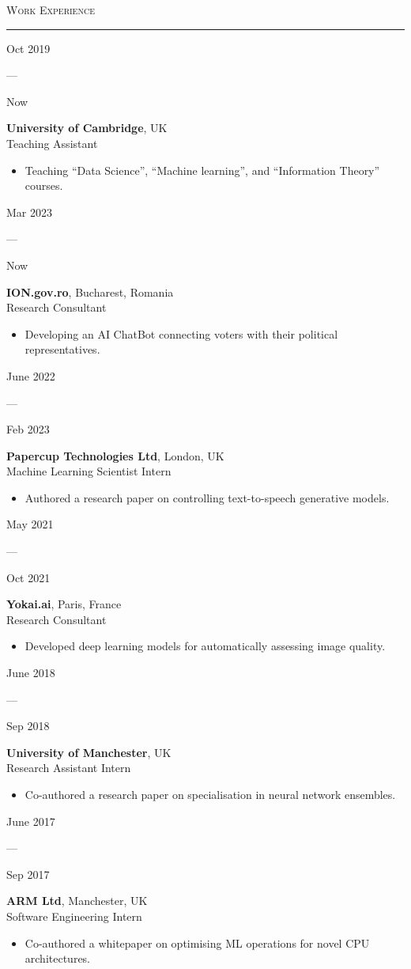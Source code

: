 \documentclass[a4paper]{article}
\newcommand{\entry}[6]{
    \begin{minipage}[t]{.05\textwidth}
        \centering #1
    \end{minipage}
    ---
    \begin{minipage}[t]{.05\textwidth}
        \centering #2
    \end{minipage}
    \hfill
    \begin{minipage}[t]{.85\textwidth}
        \textbf{#3}, #4\\
        #5\\
        \vspace{-1em}
        #6
    \end{minipage}
}
\begin{document}
\vspace{1em}

\textsc{\Large Work Experience}

\rule{\textwidth}{1pt}

\entry{Oct 2019}{Now}{University of Cambridge}{UK}{Teaching Assistant}{
    \begin{itemize}[leftmargin=*]
        \item Teaching ``Data Science'', ``Machine learning'', and ``Information Theory'' courses.
    \end{itemize}
}

\entry{Mar 2023}{Now}{ION.gov.ro}{Bucharest, Romania}{Research Consultant}{
    \begin{itemize}[leftmargin=*]
        \item Developing an AI ChatBot connecting voters with their political representatives.
    \end{itemize}
}

\entry{June 2022}{Feb 2023}{Papercup Technologies Ltd}{London, UK}{Machine Learning Scientist Intern}{
    \begin{itemize}[leftmargin=*]
        \item Authored a research paper on controlling text-to-speech generative models.
    \end{itemize}
}

\entry{May 2021}{Oct 2021}{Yokai.ai}{Paris, France}{Research Consultant}{
    \begin{itemize}[leftmargin=*]
        \item Developed deep learning models for automatically assessing image quality.
    \end{itemize}
}

\entry{June 2018}{Sep 2018}{University of Manchester}{UK}{Research Assistant Intern}{
    \begin{itemize}[leftmargin=*]
        \item Co-authored a research paper on specialisation in neural network ensembles.
    \end{itemize}
}

\entry{June 2017}{Sep 2017}{ARM Ltd}{Manchester, UK}{Software Engineering Intern}{
    \begin{itemize}[leftmargin=*]
        \item Co-authored a whitepaper on optimising ML operations for novel CPU architectures.
    \end{itemize}
}

\vspace{1em}
\end{document}
